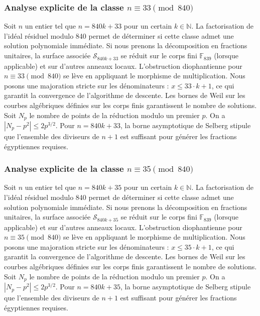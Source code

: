 \documentclass[11pt,a4paper]{article}
\begin{document}
\subsubsection{Analyse explicite de la classe $n \equiv 33 \pmod{840}$}
Soit $n$ un entier tel que $n = 840k + 33$ pour un certain $k \in \mathbb{N}$.
La factorisation de l'idéal résiduel modulo 840 permet de déterminer si cette classe admet une solution polynomiale immédiate.
Si nous prenons la décomposition en fractions unitaires, la surface associée $\mathcal{S}_{840k+33}$ se réduit sur le corps fini $\mathbb{F}_{839}$ (lorsque applicable) et sur d'autres anneaux locaux.
L'obstruction diophantienne pour $n \equiv 33 \pmod{840}$ se lève en appliquant le morphisme de multiplication.
Nous posons une majoration stricte sur les dénominateurs : $x \le 33 \cdot k + 1$, ce qui garantit la convergence de l'algorithme de descente.
Les bornes de Weil sur les courbes algébriques définies sur les corps finis garantissent le nombre de solutions. Soit $N_p$ le nombre de points de la réduction modulo un premier $p$.
On a $|N_p - p^2| \le 2 p^{3/2}$.
Pour $n = 840k + 33$, la borne asymptotique de Selberg stipule que l'ensemble des diviseurs de $n+1$ est suffisant pour générer les fractions égyptiennes requises.

\subsubsection{Analyse explicite de la classe $n \equiv 35 \pmod{840}$}
Soit $n$ un entier tel que $n = 840k + 35$ pour un certain $k \in \mathbb{N}$.
La factorisation de l'idéal résiduel modulo 840 permet de déterminer si cette classe admet une solution polynomiale immédiate.
Si nous prenons la décomposition en fractions unitaires, la surface associée $\mathcal{S}_{840k+35}$ se réduit sur le corps fini $\mathbb{F}_{839}$ (lorsque applicable) et sur d'autres anneaux locaux.
L'obstruction diophantienne pour $n \equiv 35 \pmod{840}$ se lève en appliquant le morphisme de multiplication.
Nous posons une majoration stricte sur les dénominateurs : $x \le 35 \cdot k + 1$, ce qui garantit la convergence de l'algorithme de descente.
Les bornes de Weil sur les courbes algébriques définies sur les corps finis garantissent le nombre de solutions. Soit $N_p$ le nombre de points de la réduction modulo un premier $p$.
On a $|N_p - p^2| \le 2 p^{3/2}$.
Pour $n = 840k + 35$, la borne asymptotique de Selberg stipule que l'ensemble des diviseurs de $n+1$ est suffisant pour générer les fractions égyptiennes requises.
\end{document}
